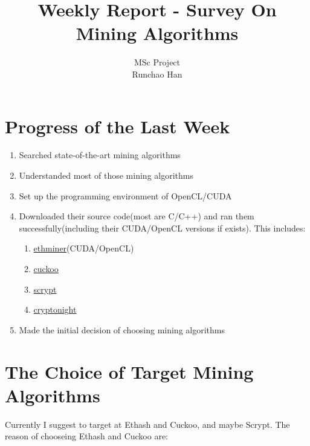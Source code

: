 \documentclass[11pt]{article}
\begin{document}
\title{Weekly Report - Survey On Mining Algorithms}
\author{MSc Project \\
Runchao Han \\
}
\maketitle
%
%

\section{Progress of the Last Week}

\begin{enumerate}
\item Searched state-of-the-art mining algorithms
\item Understanded most of those mining algorithms
\item Set up the programming environment of OpenCL/CUDA
\item Downloaded their source code(most are C/C++) and ran them successfully(including their CUDA/OpenCL versions if exists). This includes:
	\begin{enumerate}
	\item \href{https://github.com/ethereum-mining/ethminer}{ethminer}(CUDA/OpenCL)
	\item \href{https://github.com/tromp/cuckoo}{cuckoo}
	\item \href{https://github.com/Tarsnap/scrypt}{scrypt}
	\item \href{https://github.com/tsiv/ccminer-cryptonight}{cryptonight}
	\end{enumerate}
\item Made the initial decision of choosing mining algorithms
\end{enumerate}

\section{The Choice of Target Mining Algorithms}

Currently I suggest to target at Ethash and Cuckoo, and maybe Scrypt. The reason of chooseing Ethash and Cuckoo are:
\end{document}
